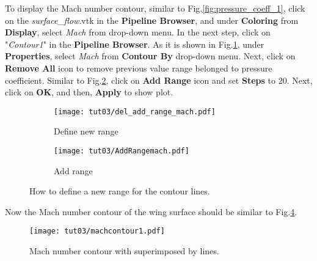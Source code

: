 To display the Mach number contour, similar to Fig.\ref{fig:pressure_coeff_1}, click on the \textit{surface\_flow}.vtk in the \textbf{Pipeline Browser}, and under \textbf{Coloring} from \textbf{Display}, select \textit{Mach} from drop-down menu. In the next step, click on "\textit{Contour1}" in the \textbf{Pipeline Browser}. As it is shown in Fig.\ref{fig:contourby2 a}, under \textbf{Properties}, select \textit{Mach} from \textbf{Contour By} drop-down menu. Next, click on \textbf{Remove All} icon to remove previous value range belonged to pressure coefficient. Similar to Fig.\ref{fig:contourby2 b}, click on \textbf{Add Range} icon and set \textbf{Steps} to 20. Next, click on \textbf{OK}, and then, \textbf{Apply} to show plot.
\begin{figure}[htbp]
    \centering
     \begin{subfigure}[b]{.4\textwidth}
         \centering
         \texttt{[image: tut03/del\_add\_range\_mach.pdf]}
         \caption{Define new range}
         \label{fig:contourby2 a}
     \end{subfigure}
     \hfill
     \begin{subfigure}[b]{.4\textwidth}
         \centering
         \texttt{[image: tut03/AddRangemach.pdf]}
         \caption{Add range}
         \label{fig:contourby2 b}
     \end{subfigure}     
    \caption{How to define a new range for the contour lines.}
    \label{fig:contourby2}
\end{figure}
Now the Mach number contour of the wing surface should be similar to Fig.\ref{fig:mach_contour}.
\begin{figure}[htbp]
    \centering
    \texttt{[image: tut03/machcontour1.pdf]}
    \caption{Mach number contour with superimposed by lines.}
    \label{fig:mach_contour}
\end{figure}
